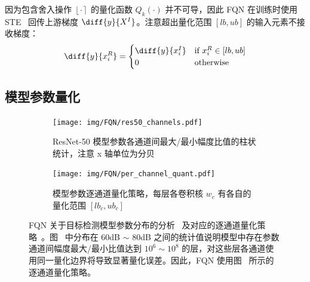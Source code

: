 \documentclass[
  fontset = mac,
]{shtthesis}
\providecommand{\Round}[1]{\left\lfloor #1 \right\rceil}
\begin{document}
因为包含舍入操作 $\Round{\cdot}$ 的量化函数 $Q_k(\cdot)$ 并不可导，因此 FQN 在训练时使用 STE~\citep{bengio2013estimating} 回传上游梯度 $\diff{y}{X^I}$。注意超出量化范围 $[lb, ub]$ 的输入元素不接收梯度：
\begin{align}
  \diff{y}{x^R_i} = 
    \begin{cases}
      \diff{y}{x^I_i} & \text{if } x^R_i \in [lb, ub] \\
      0 & \text{otherwise}
    \end{cases}
\end{align}
\subsection{模型参数量化} \label{sec::fqn::q_weight}

\begin{figure}[htb]
  \centering
  \begin{subfigure}[t]{0.45\columnwidth}
    \centering
    \texttt{[image: img/FQN/res50\_channels.pdf]}
    \caption{ResNet-50 模型参数各通道间最大/最小幅度比值的柱状统计，注意 x 轴单位为分贝}
    \label{img::fqn::w_channels}
  \end{subfigure}
  \quad
  \begin{subfigure}[t]{0.45\columnwidth}
    \centering
    \texttt{[image: img/FQN/per\_channel\_quant.pdf]}
    \caption{模型参数逐通道量化策略，每层各卷积核 $w_c$ 有各自的量化范围 $[lb_c, ub_c]$}
    \label{img::fqn::channel_quant}
  \end{subfigure}
  \caption{FQN 关于目标检测模型参数分布的分析~ 及对应的逐通道量化策略~。图~ 中分布在 60dB $\sim$ 80dB 之间的统计值说明模型中存在参数通道间幅度最大/最小比值达到 $10^6 \sim 10^8$ 的层，对这些层各通道使用同一量化边界将导致显著量化误差。因此，FQN 使用图~ 所示的逐通道量化策略。}
  \label{img::fqn::w_quant}
\end{figure}
\end{document}
